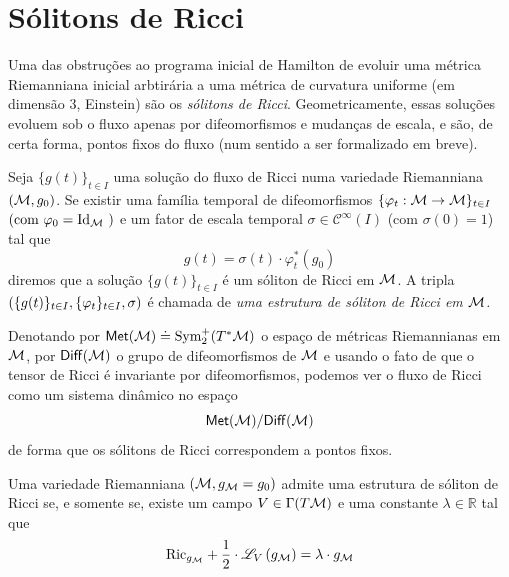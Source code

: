   \section{Sólitons de Ricci}
  Uma das obstruções ao programa inicial de Hamilton de evoluir uma métrica Riemanniana inicial arbtirária a uma métrica de curvatura uniforme (em dimensão $3$, Einstein) são os \emph{sólitons de Ricci}. Geometricamente, essas soluções evoluem sob o fluxo apenas por difeomorfismos e mudanças de escala, e são, de certa forma, pontos fixos do fluxo (num sentido a ser formalizado em breve).
  
  \begin{deff}\label{defSoliton}
  Seja $\{g(t)\}_{t \in I}$ uma solução do fluxo de Ricci numa variedade Riemanniana $(\mathcal{M}, g_0)$. Se existir uma família temporal de difeomorfismos $\{ \varphi_t : \mathcal{M} \to \mathcal{M}\}_{t \in I}$ $\left(\text{com $\varphi_0 = \operatorname{Id}_{\mathcal{M}}$ }\right)$ e um fator de escala temporal $\sigma \in \mathscr{C}^{\infty}(I)$ (com $\sigma(0) = 1$) tal que
  \begin{equation}\label{RicSoliton}
  g(t) = \sigma(t) \cdot \varphi_t^{*}(g_0)
  \end{equation}
  diremos que a solução $\{g(t) \}_{t \in I}$ é um sóliton de Ricci em $\mathcal{M}$. A tripla $\left(\{g(t) \}_{t \in I}, \{\varphi_t \}_{t \in I}, \sigma \right)$ é chamada de \emph{uma estrutura de sóliton de Ricci em $\mathcal{M}$.}
  \end{deff}
  
  \begin{oobs}
  Denotando por ${\sf Met}(\mathcal{M}) \doteq \operatorname{Sym}_2^{+}(T^{*}\mathcal{M})$ o espaço de métricas Riemannianas em $\mathcal{M}$, por ${\sf Diff}(\mathcal{M})$ o grupo de difeomorfismos de $\mathcal{M}$ e usando o fato de que o tensor de Ricci é invariante por difeomorfismos, podemos ver o fluxo de Ricci como um sistema dinâmico no espaço 
  \[
  {\sf Met}(\mathcal{M}) / {\sf Diff}(\mathcal{M})
  \] de forma que os sólitons de Ricci correspondem a pontos fixos.
  \end{oobs}


  \begin{proposicao}\label{PropEstrutura}
    Uma variedade Riemanniana $(\mathcal{M}, g_{\mathcal{M}} = g_0)$ admite uma estrutura de sóliton de Ricci se, e somente se, existe um campo $V \in \Gamma(T \mathcal{M})$ e uma constante $\lambda \in \mathbb{R}$ tal que
    \begin{equation}\label{EqVSoliton}
    \mathrm{Ric}_{g_{\mathcal{M}}} + \frac{1}{2} \cdot \mathscr{L}_{V} \left( g_{\mathcal{M}} \right) = \lambda \cdot g_{\mathcal{M}} 
    \end{equation}
  \end{proposicao}

